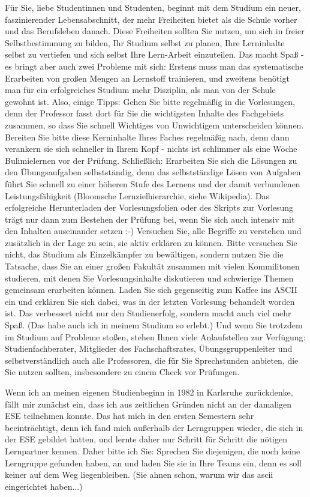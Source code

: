 Für Sie, liebe Studentinnen und Studenten, beginnt mit dem Studium ein neuer, faszinierender Lebensabschnitt, der mehr Freiheiten bietet als die Schule vorher und das Berufsleben danach. Diese Freiheiten sollten Sie nutzen, um sich in freier Selbstbestimmung zu bilden, Ihr Studium selbst zu planen, Ihre Lerninhalte selbst zu vertiefen und sich selbst Ihre Lern-Arbeit einzuteilen. Das macht Spaß - es bringt aber auch zwei Probleme mit sich: Erstens muss man das systematische Erarbeiten von großen Mengen an Lernstoff trainieren, und zweitens benötigt man für ein erfolgreiches Studium mehr Disziplin, als man von der Schule gewohnt ist. Also, einige Tipps: Gehen Sie bitte regelmäßig in die Vorlesungen, denn der Professor fasst dort für Sie die wichtigsten Inhalte des Fachgebiets zusammen, so dass Sie schnell Wichtiges von Unwichtigem unterscheiden können. Bereiten Sie bitte diese Kerninhalte Ihres Faches regelmäßig nach, denn dann verankern sie sich schneller in Ihrem Kopf - nichts ist schlimmer als eine Woche Bulimielernen vor der Prüfung. Schließlich: Erarbeiten Sie sich die Lösungen zu den Übungsaufgaben selbstständig, denn das selbstständige Lösen von Aufgaben führt Sie schnell zu einer höheren Stufe des Lernens und der damit verbundenen Leistungsfähigkeit (Bloomsche Lernzielhierarchie, siehe Wikipedia). Das erfolgreiche Herunterladen der Vorlesungsfolien oder des Skripts zur Vorlesung trägt nur dann zum Bestehen der Prüfung bei, wenn Sie sich auch intensiv mit den Inhalten auseinander setzen :-) Versuchen Sie, alle Begriffe zu verstehen und zusätzlich in der Lage zu sein, sie aktiv erklären zu können. Bitte versuchen Sie nicht, das Studium als Einzelkämpfer zu bewältigen, sondern nutzen Sie die Tatsache, dass Sie an einer großen Fakultät zusammen mit vielen Kommilitonen studieren, mit denen Sie Vorlesungsinhalte diskutieren und schwierige Themen gemeinsam erarbeiten können. Laden Sie sich gegenseitig zum Kaffee ins ASCII ein und erklären Sie sich dabei, was in der letzten Vorlesung behandelt worden ist. Das verbessert nicht nur den Studienerfolg, sondern macht auch viel mehr Spaß. (Das habe auch ich in meinem Studium so erlebt.) Und wenn Sie trotzdem im Studium auf Probleme stoßen, stehen Ihnen viele Anlaufstellen zur Verfügung: Studienfachberater, Mitglieder des Fachschaftsrates, Übungsgruppenleiter und selbstverständlich auch alle Professoren, die für Sie Sprechstunden anbieten, die Sie nutzen sollten, insbesondere zu einem Check vor Prüfungen.

Wenn ich an meinen eigenen Studienbeginn in 1982 in Karlsruhe zurückdenke, fällt mir zunächst ein, dass ich aus zeitlichen Gründen nicht an der damaligen ESE teilnehmen konnte. Das hat mich in den ersten Semestern sehr beeinträchtigt, denn ich fand mich außerhalb der Lerngruppen wieder, die sich in der ESE gebildet hatten, und lernte daher nur Schritt für Schritt die nötigen Lernpartner kennen. Daher bitte ich Sie: Sprechen Sie diejenigen, die noch keine Lerngruppe gefunden haben, an und laden Sie sie in Ihre Teams ein, denn es soll keiner auf dem Weg liegenbleiben. (Sie ahnen schon, warum wir das ascii eingerichtet haben...)

